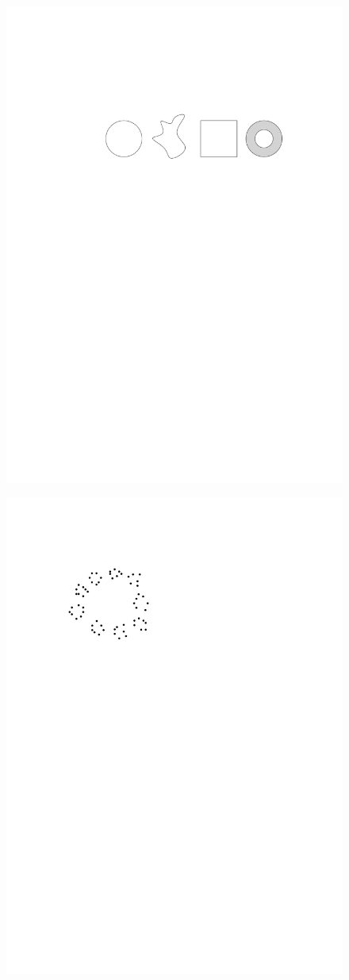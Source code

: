\begin{figure}
\centering
\begin{minipage}{.7\textwidth}
  \centering
  \includegraphics[width=.9\linewidth]{figures/ExampleDeformation}
  \label{fig:deformation}
\end{minipage}%
\begin{minipage}{.3\textwidth}
  \centering
  \includegraphics[width=.5\linewidth]{figures/ExampleScale}

\end{minipage}
\end{figure}
